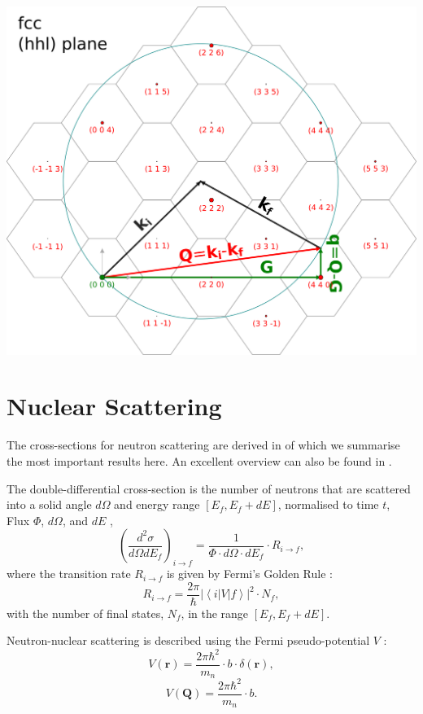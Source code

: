 \documentclass[english]{book}
\begin{document}
\begin{center}
	\includegraphics[width = 0.75 \textwidth]{recip}
\end{center}


\section{Nuclear Scattering}

The  cross-sections for neutron scattering are derived in \cite[Ch. 2]{Squires2012} of which we summarise the most important results here.
An excellent overview can also be found in \cite[Ch. 2]{Shirane2002}.

The double-differential cross-section is the number of neutrons that are scattered into a solid angle $d\Omega$ and energy range 
$\left[ E_f, E_f + dE \right]$, normalised to time $t$, Flux $\Phi$, $d\Omega$, and $dE$ \cite[p. 10]{Squires2012},
\begin{equation}
\left(\frac{d^2 \sigma}{d\Omega dE_f}\right)_{i \rightarrow f} = \frac{1}{\Phi \cdot d\Omega \cdot dE_f} \cdot R_{i \rightarrow f},
\end{equation}
where the transition rate $R_{i \rightarrow f}$ is given by Fermi's Golden Rule \cite[p. 509]{Merzbacher1998}:
\begin{equation}
	R_{i \rightarrow f} = \frac{2\pi}{\hbar} \left| \left< i | V | f \right> \right|^2 \cdot N_f,
\end{equation}
with the number of final states, $N_f$, in the range $\left[ E_f, E_f + dE \right]$.

Neutron-nuclear scattering is described using the Fermi pseudo-potential $V$ \cite[p. 15]{Squires2012}:
\begin{equation}
	V \left( \bm{r} \right) = \frac{2\pi \hbar^2}{m_n} \cdot b \cdot \delta \left( \bm{r} \right),
\end{equation}
\begin{equation}
V \left( \bm{Q} \right) = \frac{2\pi \hbar^2}{m_n} \cdot b.
\end{equation}
\end{document}
